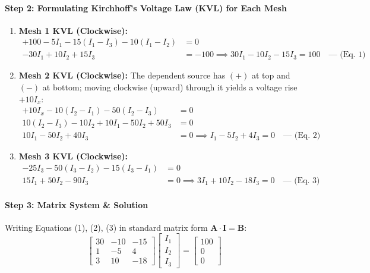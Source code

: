\documentclass[11pt,a4paper,oneside]{article}
\begin{document}
\paragraph{Step 2: Formulating Kirchhoff's Voltage Law (KVL) for Each Mesh}
\begin{enumerate}[leftmargin=1.5em]
  \item \textbf{Mesh 1 KVL (Clockwise):}
  \begin{align}
    +100 - 5 I_1 - 15(I_1 - I_3) - 10(I_1 - I_2) &= 0 \nonumber \\
    -30 I_1 + 10 I_2 + 15 I_3 &= -100 \implies 30 I_1 - 10 I_2 - 15 I_3 = 100 \quad \text{--- (Eq. 1)}
  \end{align}

  \item \textbf{Mesh 2 KVL (Clockwise):}
  The dependent source has $(+)$ at top and $(-)$ at bottom; moving clockwise (upward) through it yields a voltage rise $+10I_x$:
  \begin{align}
    +10 I_x - 10(I_2 - I_1) - 50(I_2 - I_3) &= 0 \nonumber \\
    10(I_2 - I_3) - 10 I_2 + 10 I_1 - 50 I_2 + 50 I_3 &= 0 \nonumber \\
    10 I_1 - 50 I_2 + 40 I_3 &= 0 \implies I_1 - 5 I_2 + 4 I_3 = 0 \quad \text{--- (Eq. 2)}
  \end{align}

  \item \textbf{Mesh 3 KVL (Clockwise):}
  \begin{align}
    -25 I_3 - 50(I_3 - I_2) - 15(I_3 - I_1) &= 0 \nonumber \\
    15 I_1 + 50 I_2 - 90 I_3 &= 0 \implies 3 I_1 + 10 I_2 - 18 I_3 = 0 \quad \text{--- (Eq. 3)}
  \end{align}
\end{enumerate}

\paragraph{Step 3: Matrix System \& Solution}
Writing Equations (1), (2), (3) in standard matrix form $\mathbf{A} \cdot \mathbf{I} = \mathbf{B}$:
\begin{equation}
\begin{bmatrix}
30 & -10 & -15 \\
1 & -5 & 4 \\
3 & 10 & -18
\end{bmatrix}
\begin{bmatrix}
I_1 \\ I_2 \\ I_3
\end{bmatrix}
=
\begin{bmatrix}
100 \\ 0 \\ 0
\end{bmatrix}
\end{equation}
\end{document}
